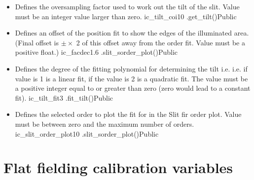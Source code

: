 \begin{itemize}

\item {}
{Defines the oversampling factor used to work out the tilt of the slit. Value must be an integer value larger than zero.}
{ic\_tilt\_coi}{10}
{\calSLIT}{\constantsfile}{\spirouImage.get\_tilt()}{Public}


\item {}
{Defines an offset of the position fit to show the edges of the illuminated area. (Final offset is $\pm \times$ 2 of this offset away from the order fit. Value must be a positive float.)}
{ic\_facdec}{1.6}
{\calSLIT}{\constantsfile}{\spirouPlot.slit\_sorder\_plot()}{Public}


\item {}
{Defines the degree of the fitting polynomial for determining the tilt i.e. i.e. if value is 1 is a linear fit, if the value is 2 is a quadratic fit.  The value must be a positive integer equal to or greater than zero (zero would lead to a constant fit).}
{ic\_tilt\_fit}{3}
{\calSLIT}{\constantsfile}{\spirouImage.fit\_tilt()}{Public}


\item {}
{Defines the selected order to plot the fit for in the Slit fir order plot. Value must be between zero and the maximum number of orders.}
{ic\_slit\_order\_plot}{10}
{\calSLIT}{\constantsfile}{\spirouPlot.slit\_sorder\_plot()}{Public}


\end{itemize}


\clearpage
\newpage
\section{Flat fielding calibration variables}
\label{ch:variables:flatfielding}

